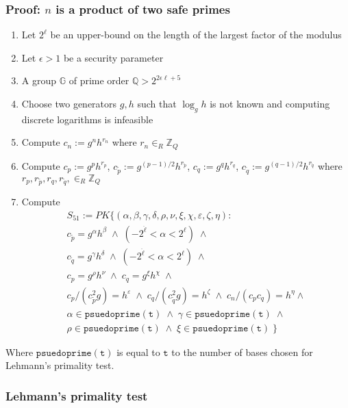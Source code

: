 \subsubsection{Proof: $n$ is a product of two safe primes}
\begin{enumerate}
    \item Let $2^\ell$ be an upper-bound on the length of the largest factor of the modulus
    \item Let $\epsilon > 1$ be a security parameter
    \item A group $\mathbb{G}$ of prime order $\mathbb{Q} > 2^{2\epsilon\ell+5}$
    \item Choose two generators $g, h$ such that  $\log_gh$ is not known and computing discrete logarithms is infeasible
    \item Compute $c_n := g^nh^{r_n}$ where $r_n \in_R \mathbb{Z}_Q$
    \item Compute $c_p := g^ph^{r_p}$, $c_{\tilde{p}}:= g^{(p-1)/2}h^{r_{\tilde{p}}}$, $c_q := g^qh^{r_q}$, $c_{\tilde{q}}:= g^{(q-1)/2}h^{r_{\tilde{q}}}$ where $r_p,r_{\tilde{p}},r_q,r_{\tilde{q}}, \in_R \mathbb{Z}_Q$
    \item Compute
    \begin{align}
        S_{51} := PK\{(\alpha,\beta,\gamma,\delta,\rho,\nu,\xi,\chi,\varepsilon,\zeta,\eta):\\
        c_{\tilde{p}} = g^{\alpha}h^{\beta} \; \land \; (-2^{\ddot{\ell}} < \alpha < 2^{\ell}) \; \land \\
        c_{\tilde{q}} = g^{\gamma}h^{\delta} \; \land \; (-2^{\ddot{\ell}} < \alpha < 2^{\ell}) \; \land \\
        c_p = g^{\rho}h^{\nu} \; \land \; c_q = g^{\xi}h^{\chi} \; \land \\
        c_p/(c_{\tilde{p}}^2g) = h^{\varepsilon} \; \land \; c_q/(c_{\tilde{q}}^2g) = h^{\zeta} \; \land \; c_n/(c_p c_q) = h^{\eta} \land \\
        \alpha \in \mathtt{psuedoprime(t)} \; \land \; \gamma \in \mathtt{psuedoprime(t)} \; \land \\
        \rho \in \mathtt{psuedoprime(t)} \; \land \; \xi \in \mathtt{psuedoprime(t)} \;
        \}
    \end{align}
\end{enumerate}
Where $\mathtt{psuedoprime(t)}$ is equal to $\mathtt{t}$ to the number of bases chosen for Lehmann's primality test.

\subsubsection{Lehmann's primality test}

